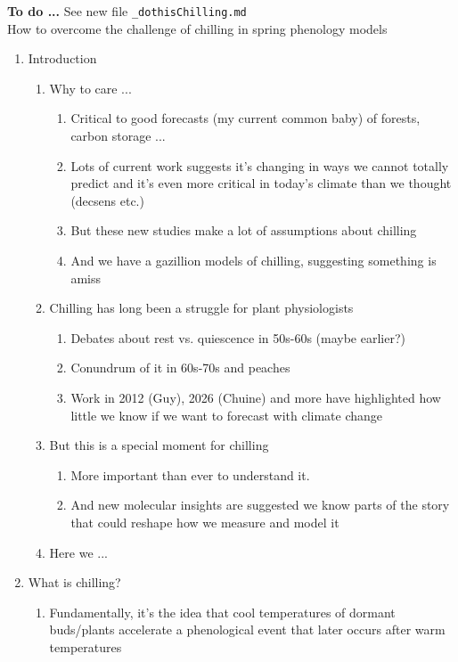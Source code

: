\documentclass[11pt,letter]{article}
\begin{document}
{\bf To do ... } See new file \verb|_dothisChilling.md|\\

{\sc How to overcome the challenge of chilling in spring phenology models} %
\begin{enumerate}
\item Introduction
\begin{enumerate}
\item Why to care ...
\begin{enumerate}
\item Critical to good forecasts (my current common baby) of forests, carbon storage ...
\item Lots of current work suggests it's changing in ways we cannot totally predict and it's even more critical in today's climate than we thought (decsens etc.)
\item But these new studies make a lot of assumptions about chilling 
\item And we have a gazillion models of chilling, suggesting something is amiss
\end{enumerate}
\item Chilling has long been a struggle for plant physiologists
\begin{enumerate}
\item Debates about rest vs. quiescence in 50s-60s (maybe earlier?)
\item Conundrum of it in 60s-70s and peaches
\item Work in 2012 (Guy), 2026 (Chuine) and more have highlighted how little we know if we want to forecast with climate change
\end{enumerate}
\item But this is a special moment for chilling
\begin{enumerate}
\item More important than ever to understand it.
\item And new molecular insights are suggested we know parts of the story that could reshape how we measure and model it
\end{enumerate}
\item Here we ...
\end{enumerate}
\item What is chilling?
\begin{enumerate}
\item Fundamentally, it's the idea that cool temperatures of dormant buds/plants accelerate a phenological event that later occurs after warm temperatures

\end{enumerate}
\end{enumerate}
\end{document}
